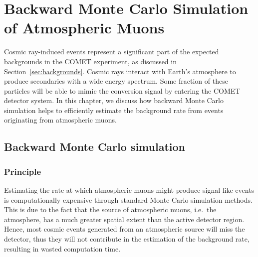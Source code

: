 \chapter[Backward Monte Carlo
Simulation of Atmospheric Muons]{Backward Monte Carlo
Simulation \\of Atmospheric Muons}\label{ch:cosmics}








Cosmic ray-induced events represent a significant part of the expected
backgrounds in the COMET experiment, as discussed in
Section~\ref{sec:backgrounds}. Cosmic rays interact with Earth's atmosphere to
produce secondaries with a wide energy spectrum. Some fraction of these
particles will be able to mimic the conversion signal by entering the COMET
detector system. In this chapter, we discuss how backward Monte Carlo simulation
helps to efficiently estimate the background rate from events originating from
atmospheric muons.

\section{Backward Monte Carlo simulation}

\subsection{Principle}\label{sec:bmc_principle}
Estimating the rate at which atmospheric muons might produce signal-like events
is computationally expensive through standard Monte Carlo simulation methods.
This is due to the fact that the source of atmospheric muons, i.e.\ the
atmosphere, has a much greater spatial extent than the active detector region.
Hence, most cosmic events generated from an atmospheric source will miss the
detector, thus they will not contribute in the estimation of the background
rate, resulting in wasted computation time.

